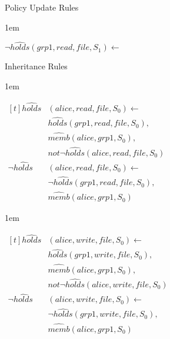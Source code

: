 \documentclass[global,twocolumn,final]{svjour}
\newenvironment{vexample}
  {\begin{example}\hspace{0.25em}}
  {\end{example}}
\newenvironment{vquote}
  {\begin{list}{}{\leftmargin 1em}\item[]}
  {\end{list}}
\begin{document}
\begin{vexample}
\begin{enumerate}
            \item
              Policy Update Rules

              \begin{vquote}
                \begin{math}
                  \lnot \hat{holds}(grp1, read, file, S_{1}) \leftarrow
                \end{math}
              \end{vquote}

            \item
              Inheritance Rules

              \begin{vquote}
                \begin{math}
                  \begin{aligned}[t]
                    \hat{holds}&(alice, read, file, S_{0}) \leftarrow \\
                    & \hat{holds}(grp1, read, file, S_{0}), \\
                    & \hat{memb}(alice, grp1, S_{0}), \\
                    & not \lnot \hat{holds}(alice, read, file, S_{0}) \\
                    \lnot \hat{holds}&(alice, read, file, S_{0}) \leftarrow \\
                    & \lnot \hat{holds}(grp1, read, file, S_{0}), \\
                    & \hat{memb}(alice, grp1, S_{0})
                  \end{aligned}
                \end{math}
              \end{vquote}

              \begin{vquote}
                \begin{math}
                  \begin{aligned}[t]
                    \hat{holds}&(alice, write, file, S_{0}) \leftarrow \\
                    & \hat{holds}(grp1, write, file, S_{0}), \\
                    & \hat{memb}(alice, grp1, S_{0}), \\
                    & not \lnot \hat{holds}(alice, write, file, S_{0}) \\
                    \lnot \hat{holds}&(alice, write, file, S_{0}) \leftarrow \\
                    & \lnot \hat{holds}(grp1, write, file, S_{0}), \\
                    & \hat{memb}(alice, grp1, S_{0})
                  \end{aligned}
                \end{math}
               \end{vquote}


\end{enumerate}
\end{vexample}
\end{document}

